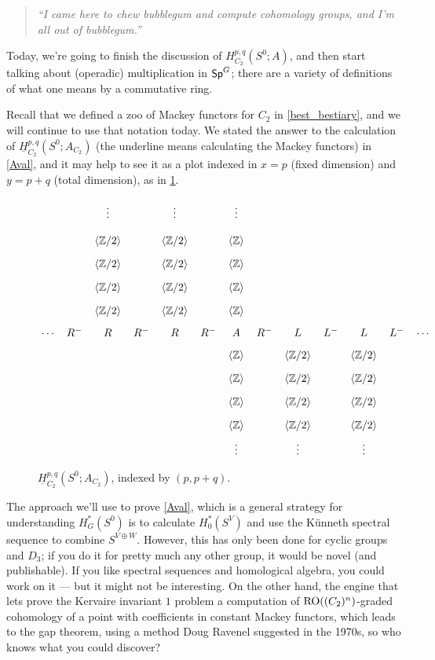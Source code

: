 \begin{quote}\textit{
	``I came here to chew bubblegum and compute cohomology groups, and I'm all out of bubblegum.''
}\end{quote}
Today, we're going to finish the discussion of $H_{C_2}^{p,q}(S^0;A)$, and then start talking about (operadic)
multiplication in $\mathsf{Sp}^G$; there are a variety of definitions of what one means by a commutative ring.

Recall that we defined a zoo of Mackey functors for $C_2$ in \cref{best_bestiary}, and we will continue to use that
notation today. We stated the answer to the calculation of $\underline H_{C_2}^{p,q}(S^0;A_{C_2})$ (the underline
means calculating the Mackey functors) in \cref{Aval}, and it may help to see it as a plot indexed in $x = p$
(fixed dimension) and $y = p+q$ (total dimension), as in \cref{ROgdiag}.
\begin{figure}[h!]
\[\xymatrix@R=0.2cm@C=0.2cm{ %
	& & \vdots     && \vdots     && \vdots\\
	& & \ang{\Z/2} && \ang{\Z/2} && \ang\Z\\
	& & \ang{\Z/2} && \ang{\Z/2} && \ang\Z\\
	& & \ang{\Z/2} && \ang{\Z/2} && \ang\Z\\
	& & \ang{\Z/2} && \ang{\Z/2} && \ang\Z\\
	\dotsb & R^- & R & R^- & R & R^- & A & R^- & L & L^- & L & L^- & \dotsb\\
	& & & & & & \ang\Z && \ang{\Z/2} && \ang{\Z/2}\\
	& & & & & & \ang\Z && \ang{\Z/2} && \ang{\Z/2}\\
	& & & & & & \ang\Z && \ang{\Z/2} && \ang{\Z/2}\\
	& & & & & & \ang\Z && \ang{\Z/2} && \ang{\Z/2}\\
	& & & & & & \vdots && \vdots && \vdots
}\]
\caption{$\underline H_{C_2}^{p,q}(S^0;A_{C_2})$, indexed by $(p,p+q)$.}
\label{ROgdiag}
\end{figure}

The approach we'll use to prove \cref{Aval}, which is a general strategy for understanding $H_G^*(S^0)$ is to
calculate $H_0^*(S^V)$ and use the Künneth spectral sequence to combine $S^{V\oplus W}$. However, this has only
been done for cyclic groups and $D_3$; if you do it for pretty much any other group, it would be novel (and
publishable). If you like spectral sequences and homological algebra, you could work on it --- but it might not be
interesting. On the other hand, the engine that lets \cite{HHR} prove the Kervaire invariant $1$ problem a
computation of $\mathrm{RO}((C_2)^n)$-graded cohomology of a point with coefficients in constant Mackey functors, which
leads to the gap theorem, using a method Doug Ravenel suggested in the 1970s, so who knows what you could
discover?

